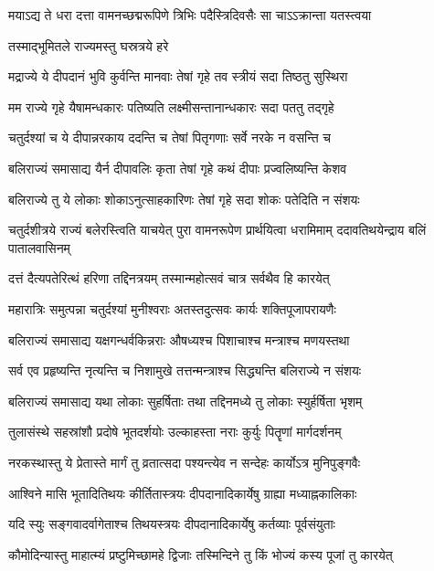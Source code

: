 \twolineshloka
{मयाऽद्य ते धरा दत्ता वामनच्छद्मरूपिणे}
{त्रिभिः पदैस्त्रिदिवसैः सा चाऽऽक्रान्ता यतस्त्वया} %


\onelineshloka
{तस्माद्भूमितले राज्यमस्तु घस्रत्रये हरे} %

\twolineshloka
{मद्राज्ये ये दीपदानं भुवि कुर्वन्ति मानवाः}
{तेषां गृहे तव स्त्रीयं सदा तिष्ठतु सुस्थिरा} %

\twolineshloka
{मम राज्ये गृहे यैषामन्धकारः पतिष्यति}
{लक्ष्मीसन्तानान्धकारः सदा पततु तद्गृहे} %

\twolineshloka
{चतुर्दश्यां च ये दीपान्नरकाय ददन्ति च}
{तेषां पितृगणाः सर्वे नरके न वसन्ति च} %

\twolineshloka
{बलिराज्यं समासाद्य यैर्न दीपावलिः कृता}
{तेषां गृहे कथं दीपाः प्रज्वलिष्यन्ति केशव} %

\twolineshloka
{बलिराज्ये तु ये लोकाः शोकाऽनुत्साहकारिणः}
{तेषां गृहे सदा शोकः पतेदिति न संशयः} %

\threelineshloka
{चतुर्दशीत्रये राज्यं बलेरस्त्विति याचयेत्}
{पुरा वामनरूपेण प्रार्थयित्वा धरामिमाम्}
{ददावतिथयेन्द्राय बलिं पातालवासिनम्} %

\twolineshloka
{दत्तं दैत्यपतेरित्थं हरिणा तद्दिनत्रयम्}
{तस्मान्महोत्सवं चात्र सर्वथैव हि कारयेत्} %

\twolineshloka
{महारात्रिः समुत्पन्ना चतुर्दश्यां मुनीश्वराः}
{अतस्तदुत्सवः कार्यः शक्तिपूजापरायणैः} %

\twolineshloka
{बलिराज्यं समासाद्य यक्षगन्धर्वकिन्नराः}
{औषध्यश्च पिशाचाश्च मन्त्राश्च मणयस्तथा} %

\twolineshloka
{सर्व एव प्रहृष्यन्ति नृत्यन्ति च निशामुखे}
{तत्तन्मन्त्राश्च सिद्ध्यन्ति बलिराज्ये न संशयः} %

\twolineshloka
{बलिराज्यं समासाद्य यथा लोकाः सुहर्षिताः}
{तथा तद्दिनमध्ये तु लोकाः स्युर्हर्षिता भृशम्} %

\twolineshloka
{तुलासंस्थे सहस्रांशौ प्रदोषे भूतदर्शयोः}
{उल्काहस्ता नराः कुर्युः पितॄणां मार्गदर्शनम्} %

\twolineshloka
{नरकस्थास्तु ये प्रेतास्ते मार्गं तु व्रतात्सदा}
{पश्यन्त्येव न सन्देहः कार्योऽत्र मुनिपुङ्गवैः} %

\twolineshloka
{आश्विने मासि भूतादितिथयः कीर्तितास्त्रयः}
{दीपदानादिकार्येषु ग्राह्या मध्याह्नकालिकाः} %

\twolineshloka
{यदि स्युः सङ्गवादर्वागेताश्च तिथयस्त्रयः}
{दीपदानादिकार्येषु कर्तव्याः पूर्वसंयुताः} %


\twolineshloka
{कौमोदिन्यास्तु माहात्म्यं प्रष्टुमिच्छामहे द्विजाः}
{तस्मिन्दिने तु किं भोज्यं कस्य पूजां तु कारयेत्} %

